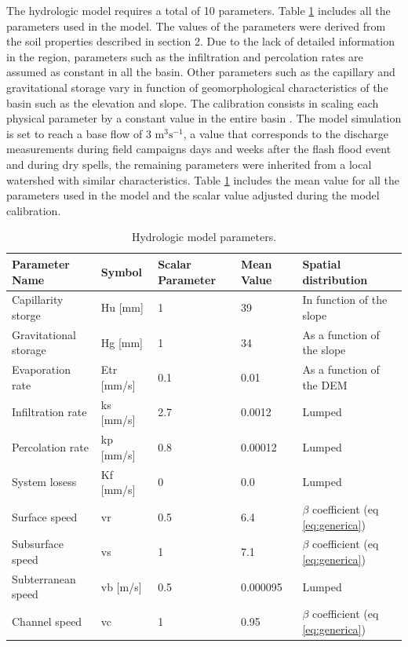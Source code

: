 \documentclass[hess, manuscript]{copernicus}
\begin{document}
The hydrologic model requires a total of 10 parameters. Table \ref{tab:parameters} includes all the parameters used in the model.  The values of the parameters were derived from the soil properties described in section 2. Due to the lack of detailed information in the region, parameters such as the infiltration and percolation rates are assumed as constant in all the basin.  Other parameters such as the capillary and gravitational storage vary in function of geomorphological characteristics of the basin such as the elevation and slope. The calibration consists in scaling each physical parameter by a constant value in the entire basin \citep{Frances2007d}. The model simulation is set to reach a base flow of 3 m$^3 \text{s}^{-1}$, a value that corresponds to the discharge measurements during field campaigns days and weeks after the flash flood event and during dry spells, the remaining parameters were inherited from a local watershed with similar characteristics.  Table \ref{tab:parameters} includes the mean value for all the parameters used in the model and the scalar value adjusted during the model calibration.

\begin{table}[]
        \centering
        \begin{tabularx}{\textwidth}{p{3cm} p{2.2cm} p{1.5cm} p{2cm} p{3.5cm}}
\hline
Parameter Name & Symbol & Scalar Parameter & Mean Value & Spatial distribution \\
\hline
Capillarity storge & Hu [mm] & 1 & 39 & In function of the slope \\
Gravitational storage & Hg [mm] & 1 & 34 & As a function of the slope \\
Evaporation rate & Etr [mm/s] & 0.1 & 0.01 & As a function of the DEM \\
Infiltration rate & ks [mm/s] & 2.7 & 0.0012 & Lumped \\
Percolation rate & kp [mm/s] & 0.8 & 0.00012 & Lumped \\
System losess & Kf [mm/s] & 0 & 0.0 & Lumped \\
Surface speed & vr & 0.5 & 6.4 & $\beta$ coefficient (eq \ref{eq:generica}) \\
Subsurface speed & vs & 1 & 7.1 & $\beta$ coefficient (eq \ref{eq:generica})\\
Subterranean speed & vb [m/s] & 0.5 & 0.000095 & Lumped \\
Channel speed & vc  & 1 & 0.95 & $\beta$ coefficient (eq \ref{eq:generica}) \\
\hline
\end{tabularx}
        \caption{Hydrologic model parameters.}
        \label{tab:parameters}
    \end{table}
\end{document}
